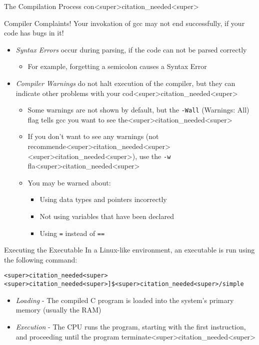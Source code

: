 \documentclass[11pt]{beamer}
\begin{document}
\begin{frame}{The Compilation Process con<super>citation_needed<super>}
\center
\
\end{frame}

\begin{frame}{Compiler Complaints!}
Your invokation of gcc may not end successfully, if your code has bugs in it! 
\begin{itemize}
\item \textit{Syntax Errors} occur during parsing, if the code can not be parsed correctly
	\begin{itemize}
	\item For example, forgetting a semicolon causes a Syntax Error
	\end{itemize}
\item \textit{Compiler Warnings} do not halt execution of the compiler, but they can indicate other problems with your cod<super>citation_needed<super>  
	\begin{itemize}
	\item Some warnings are not shown by default, but the \texttt{-Wall} (Warnings: All) flag tells gcc you want to see the<super>citation_needed<super>
	\item If you don't want to see any warnings (not recommende<super>citation_needed<super><super>citation_needed<super>), use the \texttt{-w} fla<super>citation_needed<super>
	\item You may be warned about:
		\begin{itemize}
			\item Using data types and pointers incorrectly
			\item Not using variables that have been declared
			\item Using \texttt{=} instead of \texttt{==}
		\end{itemize}
	\end{itemize}
\end{itemize}
\end{frame}

\begin{frame}[fragile=singleslide]{Executing the Executable}
In a Linux-like environment, an executable is run using the following command:
\begin{verbatim}
<super>citation_needed<super><super>citation_needed<super>]$<super>citation_needed<super>/simple
\end{verbatim}
\begin{itemize}
\item \textit{Loading} - The compiled C program is loaded into the system's primary memory (usually the RAM)
\item \textit{Execution} - The CPU runs the program, starting with the first instruction, and proceeding until the program terminate<super>citation_needed<super>  
\end{itemize}
\end{frame}
\end{document}
